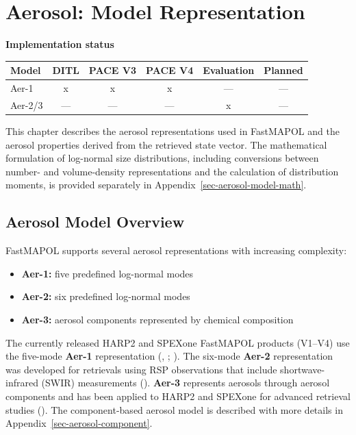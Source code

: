 \documentclass[
  11pt,
  letterpaper,
]{scrreprt}
\providecommand{\tightlist}{%
  \setlength{\itemsep}{0pt}\setlength{\parskip}{0pt}}
\begin{document}
\chapter{Aerosol: Model Representation}\label{sec-aerosol-model}

\textbf{Implementation status}

\begin{longtable}[]{@{}lccccc@{}}
\toprule\noalign{}
Model & DITL & PACE V3 & PACE V4 & Evaluation & Planned \\
\midrule\noalign{}
\endhead
\bottomrule\noalign{}
\endlastfoot
Aer-1 & x & x & x & --- & --- \\
Aer-2/3 & --- & --- & --- & x & --- \\
\end{longtable}

This chapter describes the aerosol representations used in FastMAPOL and
the aerosol properties derived from the retrieved state vector. The
mathematical formulation of log-normal size distributions, including
conversions between number- and volume-density representations and the
calculation of distribution moments, is provided separately in
Appendix~\ref{sec-aerosol-model-math}.

\section{Aerosol Model Overview}\label{aerosol-model-overview}

FastMAPOL supports several aerosol representations with increasing
complexity:

\begin{itemize}
\tightlist
\item
  \textbf{Aer-1:} five predefined log-normal modes
\item
  \textbf{Aer-2:} six predefined log-normal modes
\item
  \textbf{Aer-3:} aerosol components represented by chemical composition
\end{itemize}

The currently released HARP2 and SPEXone FastMAPOL products (V1--V4) use
the five-mode \textbf{Aer-1} representation
(,
; ). The six-mode \textbf{Aer-2} representation was developed for
retrievals using RSP observations that include shortwave-infrared (SWIR)
measurements ().
\textbf{Aer-3} represents aerosols through aerosol components and has
been applied to HARP2 and SPEXone for advanced retrieval studies
(). The component-based
aerosol model is described with more details in
Appendix~\ref{sec-aerosol-component}.
\end{document}

